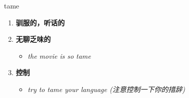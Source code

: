 
\begin{frame}
{\huge tame}
\begin{center}
\begin{enumerate}\Large
  \item \textbf{驯服的，听话的}
  \item \textbf{无聊乏味的}
  \begin{itemize}
    \item \em{\Large{the movie is so tame}}
  \end{itemize}
  \item \textbf{控制}
  \begin{itemize}
    \item \em{\Large{try to tame your language (注意控制一下你的措辞)}}
  \end{itemize}
\end{enumerate}
\end{center}
\end{frame}
